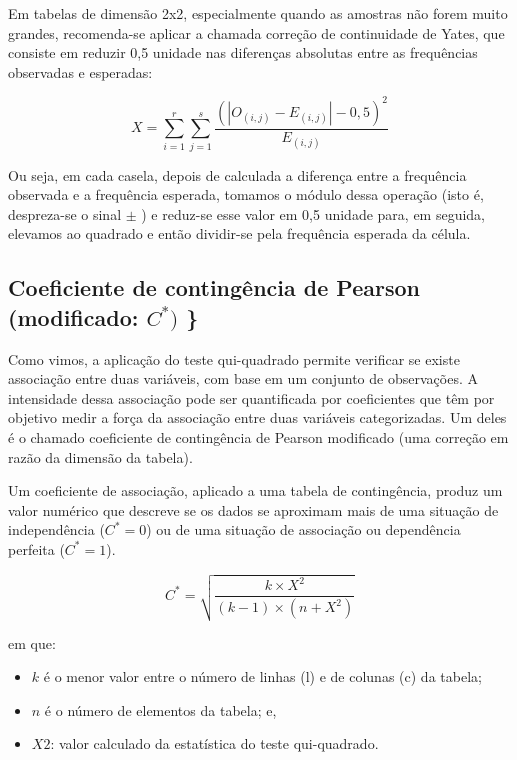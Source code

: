 \documentclass[
]{book}
\providecommand{\tightlist}{%
  \setlength{\itemsep}{0pt}\setlength{\parskip}{0pt}}
\begin{document}
Em tabelas de dimensão 2x2, especialmente quando as amostras não forem muito grandes, recomenda-se aplicar a chamada correção de continuidade de Yates, que consiste em reduzir 0,5 unidade nas diferenças absolutas entre as frequências observadas e esperadas:

\hfill\break
\[
X=\sum_{i=1}^r\sum_{j=1}^s \frac{(|O_{(i,j)} - E_{(i,j)}|-0,5)^2}{E_{(i,j)}}
\]

\hfill\break

Ou seja, em cada casela, depois de calculada a diferença entre a frequência observada e a frequência esperada, tomamos o módulo dessa operação (isto é, despreza-se o sinal \(\pm\) ) e reduz-se esse valor em 0,5 unidade para, em seguida, elevamos ao quadrado e então dividir-se pela frequência esperada da célula.

\hfill\break

\hypertarget{coeficiente-de-continguxeancia-de-pearson-modificado-c}{%
\subsection{\texorpdfstring{Coeficiente de contingência de Pearson (modificado: \(C^{*})\) \}}{Coeficiente de contingência de Pearson (modificado: C\^{}\{*\}) \}}}\label{coeficiente-de-continguxeancia-de-pearson-modificado-c}}

\hfill\break

Como vimos, a aplicação do teste qui-quadrado permite verificar se existe associação entre duas variáveis, com base em um conjunto de observações. A intensidade dessa associação pode ser quantificada por coeficientes que têm por objetivo medir a força da associação entre duas variáveis categorizadas. Um deles é o chamado coeficiente de contingência de Pearson modificado (uma correção em razão da dimensão da tabela).

\hfill\break

Um coeficiente de associação, aplicado a uma tabela de contingência, produz um valor numérico que descreve se os dados se aproximam mais de uma situação de independência (\(C^{*}=0\)) ou de uma situação de associação ou dependência perfeita (\(C^{*}=1\)).

\hfill\break

\[
C^{*} =  \sqrt{ \frac{k \times X^{2}}{(k-1)\times (n + X^{2}) } }
\]

\hfill\break

em que:

\hfill\break

\begin{itemize}
\tightlist
\item
  \(k\) é o menor valor entre o número de linhas (l) e de colunas (c) da tabela;\\
\item
  \(n\) é o número de elementos da tabela; e,\\
\item
  \(X{2}\): valor calculado da estatística do teste qui-quadrado.
\end{itemize}
\end{document}
